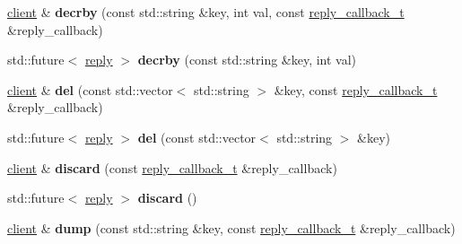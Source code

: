 \begin{DoxyCompactItemize}
\hyperlink{classcpp__redis_1_1client}{client} \& {\bfseries decrby} (const std\+::string \&key, int val, const \hyperlink{classcpp__redis_1_1client_a061a1140d36d2eaeda82b09a0bb3f9f2}{reply\+\_\+callback\+\_\+t} \&reply\+\_\+callback)
\item 
\mbox{\label{classcpp__redis_1_1client_ac4fe81368d7f9cc305811d8346e60881}} 
std\+::future$<$ \hyperlink{classcpp__redis_1_1reply}{reply} $>$ {\bfseries decrby} (const std\+::string \&key, int val)
\item 
\mbox{\label{classcpp__redis_1_1client_a29a5307b20d9ffe951e2ff302797a296}} 
\hyperlink{classcpp__redis_1_1client}{client} \& {\bfseries del} (const std\+::vector$<$ std\+::string $>$ \&key, const \hyperlink{classcpp__redis_1_1client_a061a1140d36d2eaeda82b09a0bb3f9f2}{reply\+\_\+callback\+\_\+t} \&reply\+\_\+callback)
\item 
\mbox{\label{classcpp__redis_1_1client_a99c090de7e23accfaf3b93f4b025d2e9}} 
std\+::future$<$ \hyperlink{classcpp__redis_1_1reply}{reply} $>$ {\bfseries del} (const std\+::vector$<$ std\+::string $>$ \&key)
\item 
\mbox{\label{classcpp__redis_1_1client_a0f5a07744750f87504f72dcf66144a24}} 
\hyperlink{classcpp__redis_1_1client}{client} \& {\bfseries discard} (const \hyperlink{classcpp__redis_1_1client_a061a1140d36d2eaeda82b09a0bb3f9f2}{reply\+\_\+callback\+\_\+t} \&reply\+\_\+callback)
\item 
\mbox{\label{classcpp__redis_1_1client_ab37e125f4f94bfa9455dc29f64698e47}} 
std\+::future$<$ \hyperlink{classcpp__redis_1_1reply}{reply} $>$ {\bfseries discard} ()
\item 
\mbox{\label{classcpp__redis_1_1client_aed6bb7657acdd4ea4dd0a4e7ec3eec20}} 
\hyperlink{classcpp__redis_1_1client}{client} \& {\bfseries dump} (const std\+::string \&key, const \hyperlink{classcpp__redis_1_1client_a061a1140d36d2eaeda82b09a0bb3f9f2}{reply\+\_\+callback\+\_\+t} \&reply\+\_\+callback)
\item 
\mbox{\label{classcpp__redis_1_1client_aa25f7f2648c1a013ce079ef13e8e2f0f}} 

\end{DoxyCompactItemize}
